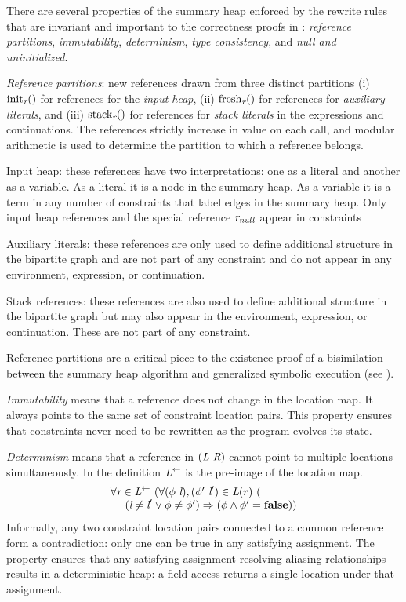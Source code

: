 There are several properties of the summary heap enforced by the
rewrite rules that are invariant and important to the correctness
proofs in : \emph{reference partitions},
\emph{immutability}, \emph{determinism}, \emph{type
  consistency}, and \emph{null and uninitialized}.

\emph{Reference partitions}: new references drawn from
  three distinct partitions (i) $\mathrm{init}_{\emph{r}}()$ for references for the \emph{input heap}, (ii) $\mathrm{fresh}_{\emph{r}}()$ for references for \emph{auxiliary literals}, and
  (iii) $\mathrm{stack}_{\emph{r}}()$ for references for \emph{stack literals} in the expressions and
  continuations. The references strictly increase in value on each
  call, and modular arithmetic is used to determine the partition to
  which a reference belongs.
\begin{compactdesc}
\item[Input heap:] these references have two
  interpretations: one as a literal and another as a variable. As a literal it is a node in
  the summary heap. As a variable it is a term in any number of constraints that label
  edges in the summary heap. Only input heap references and the
  special reference $\emph{r}_\mathit{null}$ appear in constraints
\item[Auxiliary literals:] these references are only used to define additional structure in
  the bipartite graph and are not part of any constraint and do not appear
  in any environment, expression, or continuation.
\item[Stack references:] these references are also used to define additional structure in the bipartite graph but may also appear in the environment, expression, or continuation. These are not part of any constraint.
\end{compactdesc}
Reference partitions are a critical piece to the existence proof of a
bisimilation between the summary heap algorithm and generalized
symbolic execution (see ).

\emph{Immutability} means that a reference does not change in the
location map. It always points to the same set of constraint location
pairs. This property ensures that constraints never need to be
rewritten as the program evolves its state.

\emph{Determinism} means that a reference in $(\emph{L}\ \emph{R})$ cannot point to multiple locations simultaneously. In the definition $\emph{L}^\leftarrow$ is the pre-image of the location map.
$$
\begin{array}{l}
\forall \cfgnt{r} \in \cfgnt{L}^\leftarrow\ (\forall (\phi\ \cfgnt{l}),(\phi^\prime\ \cfgnt{l}^\prime) \in \cfgnt{L}(r)\ (\\
\ \ \ \ (\cfgnt{l} \neq \cfgnt{l}^\prime \vee \phi \neq \phi^\prime) \Rightarrow (\phi \wedge \phi^\prime = \cfgt{false}))
\end{array}
$$
Informally, any two constraint location pairs connected to a
common reference form a contradiction: only one can be true in any
satisfying assignment. The property ensures that any satisfying assignment
resolving aliasing relationships results in a deterministic heap: a
field access returns a single location under that assignment.


